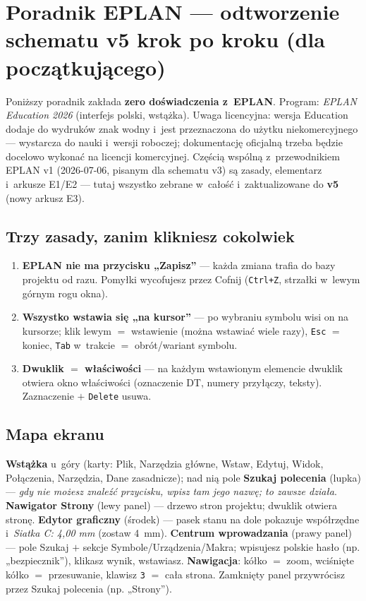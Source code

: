 \documentclass[11pt,a4paper]{article}
\begin{document}
\section{Poradnik EPLAN --- odtworzenie schematu v5 krok po kroku (dla początkującego)}
\label{sec:eplan}
Poniższy poradnik zakłada \textbf{zero doświadczenia z~EPLAN}. Program: \emph{EPLAN Education 2026}
(interfejs polski, wstążka). Uwaga licencyjna: wersja Education dodaje do wydruków znak wodny i~jest
przeznaczona do użytku niekomercyjnego --- wystarcza do nauki i~wersji roboczej; dokumentację oficjalną
trzeba będzie docelowo wykonać na licencji komercyjnej. Częścią wspólną z~przewodnikiem EPLAN v1
(2026-07-06, pisanym dla schematu v3) są zasady, elementarz i~arkusze E1/E2 --- tutaj wszystko zebrane
w~całość i~zaktualizowane do \textbf{v5} (nowy arkusz E3).

\subsection{Trzy zasady, zanim klikniesz cokolwiek}
\begin{enumerate}
\item \textbf{EPLAN nie ma przycisku „Zapisz''} --- każda zmiana trafia do bazy projektu od razu.
Pomyłki wycofujesz przez Cofnij (\texttt{Ctrl+Z}, strzałki w~lewym górnym rogu okna).
\item \textbf{Wszystko wstawia się „na kursor''} --- po wybraniu symbolu wisi on na kursorze;
klik lewym $=$ wstawienie (można wstawiać wiele razy), \texttt{Esc} $=$ koniec, \texttt{Tab} w~trakcie
$=$ obrót/wariant symbolu.
\item \textbf{Dwuklik $=$ właściwości} --- na każdym wstawionym elemencie dwuklik otwiera okno
właściwości (oznaczenie DT, numery przyłączy, teksty). Zaznaczenie $+$ \texttt{Delete} usuwa.
\end{enumerate}

\subsection{Mapa ekranu}
\textbf{Wstążka} u~góry (karty: Plik, Narzędzia główne, Wstaw, Edytuj, Widok, Połączenia, Narzędzia,
Dane zasadnicze); nad nią pole \textbf{Szukaj polecenia} (lupka) --- \emph{gdy nie możesz znaleźć
przycisku, wpisz tam jego nazwę; to zawsze działa}. \textbf{Nawigator Strony} (lewy panel) --- drzewo
stron projektu; dwuklik otwiera stronę. \textbf{Edytor graficzny} (środek) --- pasek stanu na dole
pokazuje współrzędne i~\emph{Siatka C: 4,00 mm} (zostaw 4~mm). \textbf{Centrum wprowadzania} (prawy
panel) --- pole Szukaj $+$ sekcje Symbole/Urządzenia/Makra; wpisujesz polskie hasło (np. „bezpiecznik''),
klikasz wynik, wstawiasz. \textbf{Nawigacja}: kółko $=$ zoom, wciśnięte kółko $=$ przesuwanie,
klawisz \texttt{3} $=$ cała strona. Zamknięty panel przywrócisz przez Szukaj polecenia (np. „Strony'').
\end{document}
